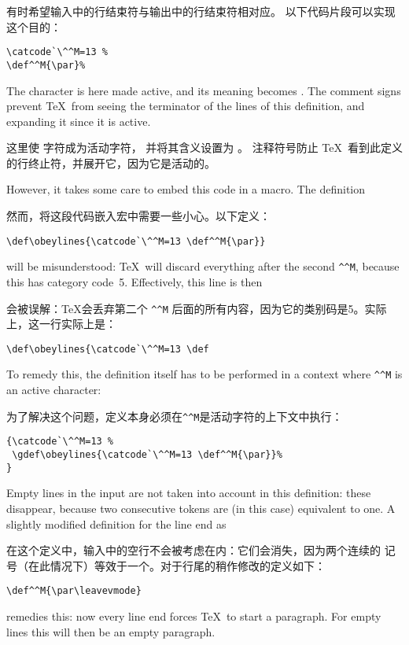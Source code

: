 有时希望输入中的行结束符与输出中的行结束符相对应。
以下代码片段可以实现这个目的：
\begin{verbatim}
\catcode`\^^M=13 %
\def^^M{\par}% 
\end{verbatim}
The  character is here made active,
and its meaning becomes .
The comment signs prevent \TeX\ from seeing the terminator of the
\alt
lines of this definition, and expanding it since it is active.

这里使  字符成为活动字符，
并将其含义设置为 。
注释符号防止 \TeX\ 看到此定义的行终止符，并展开它，因为它是活动的。

However, it takes some care to embed this code in a macro.
The definition

然而，将这段代码嵌入宏中需要一些小心。以下定义：
\begin{verbatim}
\def\obeylines{\catcode`\^^M=13 \def^^M{\par}}
\end{verbatim}
will be misunderstood:
\TeX\ will discard everything
after the second \verb>^^M>, because this has category code~5.
Effectively, this line is then

会被误解：\TeX 会丢弃第二个 \verb>^^M> 后面的所有内容，因为它的类别码是5。实际上，这一行实际上是：
\begin{verbatim}
\def\obeylines{\catcode`\^^M=13 \def
\end{verbatim}
To remedy this,
the definition itself has to be
performed in a context where \verb>^^M> is an active
character:

为了解决这个问题，定义本身必须在\verb>^^M>是活动字符的上下文中执行：
\begin{verbatim}
{\catcode`\^^M=13 %
 \gdef\obeylines{\catcode`\^^M=13 \def^^M{\par}}%
}
\end{verbatim}
Empty lines in the  input are not taken into account
in this definition: these disappear, because two consecutive 
tokens are (in this case) equivalent to one. 
A slightly modified definition for the line end as

在这个定义中，输入中的空行不会被考虑在内：它们会消失，因为两个连续的  记号（在此情况下）等效于一个。对于行尾的稍作修改的定义如下：
\begin{verbatim}
\def^^M{\par\leavevmode}
\end{verbatim}
remedies this:
now every line end forces \TeX\ to start a paragraph. For empty
lines this will then be an empty paragraph.
\awp

